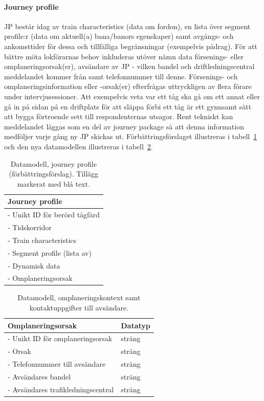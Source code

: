 \paragraph{Journey profile}
JP består idag av train characteristics (data om fordon), en lista över segment profile:r (data om aktuell(a) bana/banors egenskaper) samt avgångs- och ankomsttider för dessa och tillfälliga begränsningar (exempelvis pådrag).
För att bättre möta lokförarnas behov inkluderas utöver nämn data försenings- eller omplaneringsorsak(er), avsändare av JP - vilken bandel och driftledningscentral meddelandet kommer från samt telefonnummer till denne.
Försenings- och omplaneringsinformation eller -orsak(er) efterfrågas uttryckligen av flera förare under intervjusessioner.
Att exempelvis veta var ett tåg ska gå om ett annat eller gå in på sidan på en driftplats för att släppa förbi ett tåg är ett gynnsamt sätt att bygga förtroende sett till respondenternas utsagor.
Rent tekniskt kan meddelandet läggas som en del av journey package så att denna information medföljer varje gång ny JP skickas ut.
Förbättringsförslaget illustreras i tabell~\ref{tab:jpImproved} och den nya datamodellen illustreras i tabell~\ref{tab:omplanering}.
\begin{table}[hbt!]
    \centering
    \begin{tabular}{|l|}
        \hline
        \textbf{Journey profile} \\
        \hline
        - Unikt ID för berörd tågfärd \\
        - Tidskorridor \\
        - Train characteristics \\
        - Segment profile (lista av) \\
        - Dynamisk data \\
        \color{blue}
        - Omplaneringsorsak \\
        \hline
    \end{tabular}
    \caption{Datamodell, journey profile (förbättringsförslag). Tillägg markerat med blå text.}
    \label{tab:jpImproved}
\end{table}
\begin{table}[hbt!]
    \centering
    \begin{tabular}{|l|l|}
        \hline
        \color{blue}
        \textbf{Omplaneringsorsak} & Datatyp\\
        \hline
        - Unikt ID för omplaneringsorsak & sträng \\
        - Orsak & sträng \\
        - Telefonnummer till avsändare & sträng \\
        - Avsändares bandel & sträng \\
        - Avsändares trafikledningscentral & sträng \\
        \hline
    \end{tabular}
    \caption{Datamodell, omplaneringskontext samt kontaktuppgifter till avsändare.}
    \label{tab:omplanering}
\end{table}

